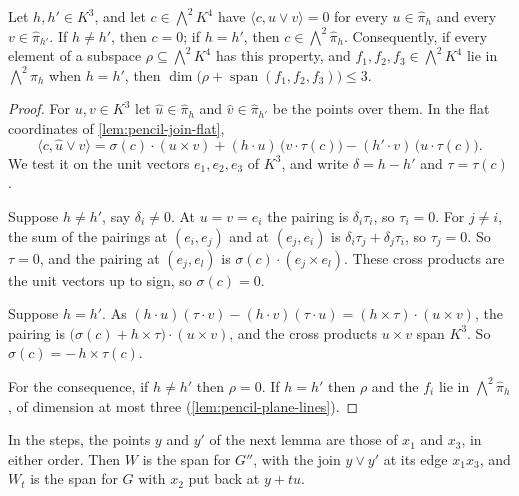 \begin{lemma}
  \label{lem:pencil-bilinear}
  \leanok
  Let $h, h' \in K^3$, and let $c \in \bigwedge^2 K^4$ have
  $\langle c, u \vee v \rangle = 0$ for every $u \in \hat\pi_h$ and
  every $v \in \hat\pi_{h'}$. If $h \neq h'$, then $c = 0$; if $h = h'$,
  then $c \in \bigwedge^2 \hat\pi_h$. Consequently, if every element of a
  subspace $\rho \subseteq \bigwedge^2 K^4$ has this property, and
  $f_1, f_2, f_3 \in \bigwedge^2 K^4$ lie in $\bigwedge^2 \hat\pi_h$ when
  $h = h'$, then $\dim\bigl(\rho + \operatorname{span}(f_1, f_2, f_3)\bigr)
  \le 3$.
\end{lemma}
\begin{proof}
  \leanok
  For $u, v \in K^3$ let $\hat u \in \hat\pi_h$ and $\hat v \in \hat\pi_{h'}$
  be the points over them. In the flat coordinates of
  \cref{lem:pencil-join-flat},
  \[
    \langle c, \hat u \vee \hat v \rangle
    = \sigma(c) \cdot (u \times v) + (h \cdot u)\,\bigl(v \cdot \tau(c)\bigr)
      - (h' \cdot v)\,\bigl(u \cdot \tau(c)\bigr).
  \]
  We test it on the unit vectors $e_1, e_2, e_3$ of $K^3$, and write
  $\delta = h - h'$ and $\tau = \tau(c)$.

  Suppose $h \neq h'$, say $\delta_i \neq 0$. At $u = v = e_i$ the
  pairing is $\delta_i \tau_i$, so $\tau_i = 0$. For $j \neq i$, the sum
  of the pairings at $(e_i, e_j)$ and at $(e_j, e_i)$ is
  $\delta_i \tau_j + \delta_j \tau_i$, so $\tau_j = 0$. So $\tau = 0$, and
  the pairing at $(e_j, e_l)$ is $\sigma(c) \cdot (e_j \times e_l)$. These
  cross products are the unit vectors up to sign, so $\sigma(c) = 0$.

  Suppose $h = h'$. As
  $(h \cdot u)(\tau \cdot v) - (h \cdot v)(\tau \cdot u) =
  (h \times \tau) \cdot (u \times v)$, the pairing is
  $\bigl(\sigma(c) + h \times \tau\bigr) \cdot (u \times v)$, and the
  cross products $u \times v$ span $K^3$. So
  $\sigma(c) = -\, h \times \tau(c)$.

  For the consequence, if $h \neq h'$ then $\rho = 0$. If $h = h'$ then
  $\rho$ and the $f_i$ lie in $\bigwedge^2 \hat\pi_h$, of dimension at most
  three (\cref{lem:pencil-plane-lines}).
\end{proof}

In the steps, the points $y$ and $y'$ of the next lemma are those of
$x_1$ and $x_3$, in either order. Then $W$ is the span for $G''$, with the join
$y \vee y'$ at its edge $x_1 x_3$, and $W_t$ is the span for $G$ with
$x_2$ put back at $y + t u$.

